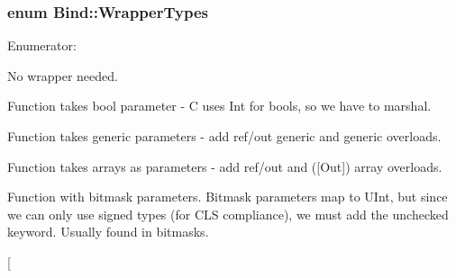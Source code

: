 \hypertarget{namespace_bind_a84806c2a8584c294f366e3b50609f0bd}{
\subsubsection[{WrapperTypes}]{\setlength{\rightskip}{0pt plus 5cm}enum {\bf Bind::WrapperTypes}}}
\label{namespace_bind_a84806c2a8584c294f366e3b50609f0bd}
\begin{Desc}
\item[Enumerator: ]\par
\begin{description}
\item[{\em 
\hypertarget{namespace_bind_a84806c2a8584c294f366e3b50609f0bd}{
None}
\label{namespace_bind_a84806c2a8584c294f366e3b50609f0bd}
}]No wrapper needed. \item[{\em 
\hypertarget{namespace_bind_a84806c2a8584c294f366e3b50609f0bd}{
BoolParameter}
\label{namespace_bind_a84806c2a8584c294f366e3b50609f0bd}
}]Function takes bool parameter -\/ C uses Int for bools, so we have to marshal. \item[{\em 
\hypertarget{namespace_bind_a84806c2a8584c294f366e3b50609f0bd}{
GenericParameter}
\label{namespace_bind_a84806c2a8584c294f366e3b50609f0bd}
}]Function takes generic parameters -\/ add ref/out generic and generic overloads. \item[{\em 
\hypertarget{namespace_bind_a84806c2a8584c294f366e3b50609f0bd}{
ArrayParameter}
\label{namespace_bind_a84806c2a8584c294f366e3b50609f0bd}
}]Function takes arrays as parameters -\/ add ref/out and (\mbox{[}Out\mbox{]}) array overloads. \item[{\em 
\hypertarget{namespace_bind_a84806c2a8584c294f366e3b50609f0bd}{
UncheckedParameter}
\label{namespace_bind_a84806c2a8584c294f366e3b50609f0bd}
}]Function with bitmask parameters. Bitmask parameters map to UInt, but since we can only use signed types (for CLS compliance), we must add the unchecked keyword. Usually found in bitmasks. \item[{\em 
}
\end{description}
\end{Desc}
